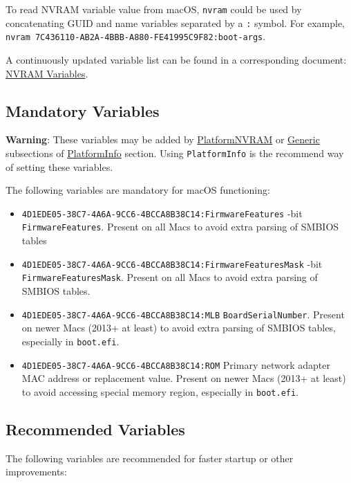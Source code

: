 \documentclass[]{article}
\providecommand{\tightlist}{%
  \setlength{\itemsep}{0pt}\setlength{\parskip}{0pt}}
\begin{document}
To read NVRAM variable value from macOS, \texttt{nvram} could be used
by concatenating GUID and name variables separated by a \texttt{:} symbol.
For example, \texttt{nvram 7C436110-AB2A-4BBB-A880-FE41995C9F82:boot-args}.

A continuously updated variable list can be found in a corresponding document:
\href{https://docs.google.com/spreadsheets/d/1HTCBwfOBkXsHiK7os3b2CUc6k68axdJYdGl-TyXqLu0}{NVRAM Variables}.

\subsection{Mandatory Variables}\label{nvramvars}

\textbf{Warning}: These variables may be added by
\hyperref[platforminfonvram]{PlatformNVRAM} or
\hyperref[platforminfogeneric]{Generic} subsections of
\hyperref[platforminfo]{PlatformInfo} section.
Using \texttt{PlatformInfo} is the recommend way of setting these variables.

The following variables are mandatory for macOS functioning:

\begin{itemize}
\tightlist
\item
  \texttt{4D1EDE05-38C7-4A6A-9CC6-4BCCA8B38C14:FirmwareFeatures}
  -bit \texttt{FirmwareFeatures}. Present on all Macs to avoid extra parsing of SMBIOS tables
\item
  \texttt{4D1EDE05-38C7-4A6A-9CC6-4BCCA8B38C14:FirmwareFeaturesMask}
  -bit \texttt{FirmwareFeaturesMask}. Present on all Macs to avoid extra parsing
  of SMBIOS tables.
\item
  \texttt{4D1EDE05-38C7-4A6A-9CC6-4BCCA8B38C14:MLB}
  \break
  \texttt{BoardSerialNumber}. Present on newer Macs (2013+ at least) to avoid extra parsing
  of SMBIOS tables, especially in \texttt{boot.efi}.
\item
  \texttt{4D1EDE05-38C7-4A6A-9CC6-4BCCA8B38C14:ROM}
  \break
  Primary network adapter MAC address or replacement value. Present on newer Macs
  (2013+ at least) to avoid accessing special memory region, especially in \texttt{boot.efi}.
\end{itemize}

\subsection{Recommended Variables}\label{nvramvarsrec}

The following variables are recommended for faster startup or other
improvements:
\end{document}
